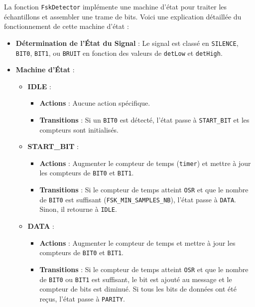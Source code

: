 
La fonction \texttt{FskDetector} implémente une machine d'état pour traiter les échantillons et assembler une trame de bits. Voici une explication détaillée du fonctionnement de cette machine d'état :

\begin{itemize}
    \item \textbf{Détermination de l'État du Signal} :
    Le signal est classé en \texttt{SILENCE}, \texttt{BIT0}, \texttt{BIT1}, ou \texttt{BRUIT} en fonction des valeurs de \texttt{detLow} et \texttt{detHigh}.
    
    \item \textbf{Machine d'État} :
    \begin{itemize}
        \item \textbf{IDLE} :
        \begin{itemize}
            \item \textbf{Actions} : Aucune action spécifique.
            \item \textbf{Transitions} : Si un \texttt{BIT0} est détecté, l'état passe à \texttt{START\_BIT} et les compteurs sont initialisés.
        \end{itemize}
        
        \item \textbf{START\_BIT} :
        \begin{itemize}
            \item \textbf{Actions} : Augmenter le compteur de temps (\texttt{timer}) et mettre à jour les compteurs de \texttt{BIT0} et \texttt{BIT1}.
            \item \textbf{Transitions} : Si le compteur de temps atteint \texttt{OSR} et que le nombre de \texttt{BIT0} est suffisant (\texttt{FSK\_MIN\_SAMPLES\_NB}), l'état passe à \texttt{DATA}. Sinon, il retourne à \texttt{IDLE}.
        \end{itemize}
        
        \item \textbf{DATA} :
        \begin{itemize}
            \item \textbf{Actions} : Augmenter le compteur de temps et mettre à jour les compteurs de \texttt{BIT0} et \texttt{BIT1}.
            \item \textbf{Transitions} : Si le compteur de temps atteint \texttt{OSR} et que le nombre de \texttt{BIT0} ou \texttt{BIT1} est suffisant, le bit est ajouté au message et le compteur de bits est diminué. Si tous les bits de données ont été reçus, l'état passe à \texttt{PARITY}.
        \end{itemize}
        

\end{itemize}
\end{itemize}
